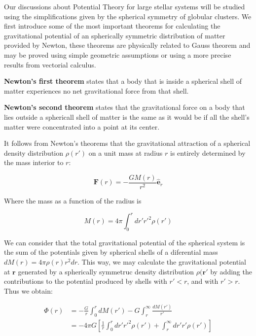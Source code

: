Our discussions about Potential Theory for large stellar systems will be studied using the simplifications given by the spherical symmetry of globular clusters. We first introduce some of the most important theorems for calculating the gravitational potential of an spherically symmetric distribution of matter provided by Newton, these theorems are physically related to Gauss theorem and may be proved using simple geometric assumptions or using a more precise results from vectorial calculus.

\textbf{Newton's first theorem} states that a body that is inside a spherical shell of matter experiences no net gravitational force from that shell. 

\textbf{Newton's second theorem} states that the gravitational force on a body that lies outside a sphericall shell of matter is the same as it would be if all the shell's matter were concentrated into a point at its center. 

It follows from Newton's theorems that the gravitational attraction of a spherical density distribution $\rho(r')$ on a unit mass at radius $r$ is entirely determined by the mass interior to $r$:

\begin{equation}
\textbf{F}(r)=-\frac{GM(r)}{r^{2}}\hat{\textbf{e}}_{r}
\end{equation}

Where the mass as a function of the radius is

\begin{equation}
M(r)=4\pi\int_{0}^{r}dr'r'^{2}\rho(r')
\end{equation}

We can consider that the total gravitational potential of the spherical system is the sum of the potentials given by spherical shells of a diferential mass $dM(r)=4\pi\rho(r)r^{2}dr$. This way, we may calculate the gravitational potential at $\textbf{r}$ generated by a spherically symmetruc density distribution $\rho(\textbf{r}'$ by adding the contributions to the potential produced by shells with $r'<r$, and with $r'>r$. Thus we obtain:

\begin{equation}
	\begin{aligned}	
	\Phi(r) &= -\frac{G}{r}\int_{0}^{r}dM(r')-G\int_{r}^{\infty}\frac{dM(r')} {r'}\\      &= -4\pi G\left[\frac{1}{r}\int_{0}^{r}dr'r'^{2}\rho(r')+\int_{r}^{\infty}dr'r'\rho(r')\right]
	\end{aligned}
\end{equation} 

